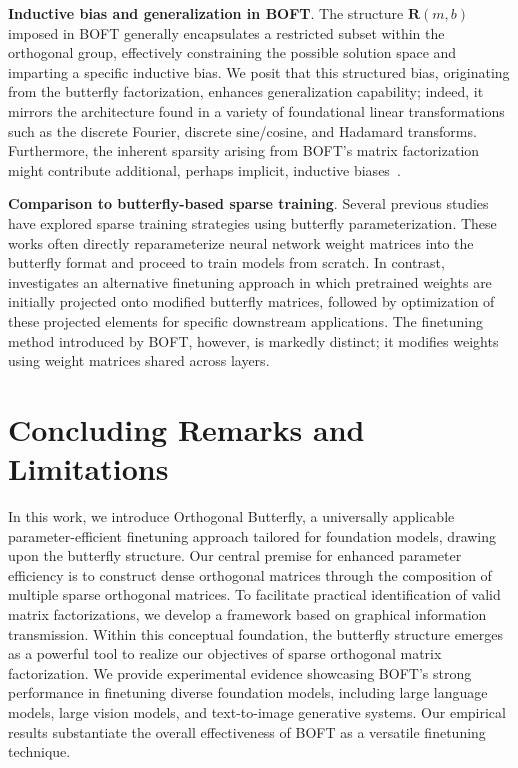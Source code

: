 \textbf{Inductive bias and generalization in BOFT}. The structure $\bm{R}(m,b)$ imposed in BOFT generally encapsulates a restricted subset within the orthogonal group, effectively constraining the possible solution space and imparting a specific inductive bias. We posit that this structured bias, originating from the butterfly factorization, enhances generalization capability; indeed, it mirrors the architecture found in a variety of foundational linear transformations~\cite{dao2019kaleidoscope} such as the discrete Fourier, discrete sine/cosine, and Hadamard transforms. Furthermore, the inherent sparsity arising from BOFT’s matrix factorization might contribute additional, perhaps implicit, inductive biases~\cite{gunasekar2017implicit,li2018algorithmic,liu2019neural}.

\textbf{Comparison to butterfly-based sparse training}. Several previous studies~\cite{dao2019learning,dao2019kaleidoscope,chen2022pixelated,dao2022monarch} have explored sparse training strategies using butterfly parameterization. These works often directly reparameterize neural network weight matrices into the butterfly format and proceed to train models from scratch. In contrast, \cite{dao2022monarch} investigates an alternative finetuning approach in which pretrained weights are initially projected onto modified butterfly matrices, followed by optimization of these projected elements for specific downstream applications. The finetuning method introduced by BOFT, however, is markedly distinct; it modifies weights using weight matrices shared across layers.



\section{Concluding Remarks and Limitations}

In this work, we introduce Orthogonal Butterfly, a universally applicable parameter-efficient finetuning approach tailored for foundation models, drawing upon the butterfly structure. Our central premise for enhanced parameter efficiency is to construct dense orthogonal matrices through the composition of multiple sparse orthogonal matrices. To facilitate practical identification of valid matrix factorizations, we develop a framework based on graphical information transmission. Within this conceptual foundation, the butterfly structure emerges as a powerful tool to realize our objectives of sparse orthogonal matrix factorization. We provide experimental evidence showcasing BOFT’s strong performance in finetuning diverse foundation models, including large language models, large vision models, and text-to-image generative systems. Our empirical results substantiate the overall effectiveness of BOFT as a versatile finetuning technique.

